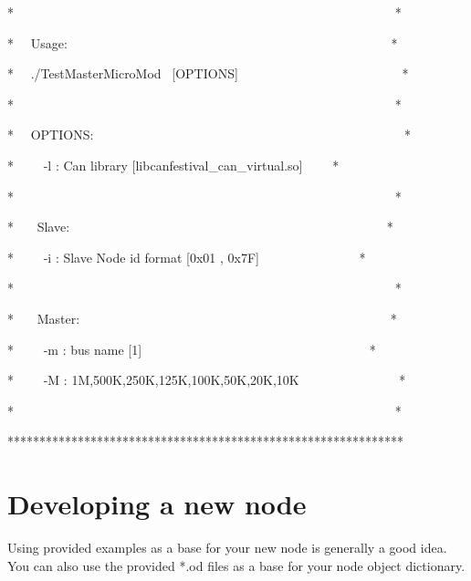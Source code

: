 \documentclass[12pt,twoside]{article}
\begin{document}
{\ttfamily
*
\ \ \ \ \ \ \ \ \ \ \ \ \ \ \ \ \ \ \ \ \ \ \ \ \ \ \ \ \ \ \ \ \ \ \ \ \ \ \ \ \ \ \ \ \ \ \ \ \ \ \ \ \ \ \ \ \ \ \ *}

{\ttfamily
* \ \ Usage:
\ \ \ \ \ \ \ \ \ \ \ \ \ \ \ \ \ \ \ \ \ \ \ \ \ \ \ \ \ \ \ \ \ \ \ \ \ \ \ \ \ \ \ \ \ \ \ \ \ \ *}

{\ttfamily
* \ \ ./TestMasterMicroMod \ [OPTIONS]
\ \ \ \ \ \ \ \ \ \ \ \ \ \ \ \ \ \ \ \ \ \ \ \ \ *}

{\ttfamily
*
\ \ \ \ \ \ \ \ \ \ \ \ \ \ \ \ \ \ \ \ \ \ \ \ \ \ \ \ \ \ \ \ \ \ \ \ \ \ \ \ \ \ \ \ \ \ \ \ \ \ \ \ \ \ \ \ \ \ \ *}

{\ttfamily
* \ \ OPTIONS:
\ \ \ \ \ \ \ \ \ \ \ \ \ \ \ \ \ \ \ \ \ \ \ \ \ \ \ \ \ \ \ \ \ \ \ \ \ \ \ \ \ \ \ \ \ \ \ \ *}

{\ttfamily
* \ \ \ \ {}-l : Can library
[{\textquotedbl}libcanfestival\_can\_virtual.so{\textquotedbl}]
\ \ \ \ *}

{\ttfamily
*
\ \ \ \ \ \ \ \ \ \ \ \ \ \ \ \ \ \ \ \ \ \ \ \ \ \ \ \ \ \ \ \ \ \ \ \ \ \ \ \ \ \ \ \ \ \ \ \ \ \ \ \ \ \ \ \ \ \ \ *}

{\ttfamily
* \ \ \ Slave:
\ \ \ \ \ \ \ \ \ \ \ \ \ \ \ \ \ \ \ \ \ \ \ \ \ \ \ \ \ \ \ \ \ \ \ \ \ \ \ \ \ \ \ \ \ \ \ \ \ *}

{\ttfamily
* \ \ \ \ {}-i : Slave Node id format [0x01 , 0x7F]
\ \ \ \ \ \ \ \ \ \ \ \ \ \ \ *}

{\ttfamily
*
\ \ \ \ \ \ \ \ \ \ \ \ \ \ \ \ \ \ \ \ \ \ \ \ \ \ \ \ \ \ \ \ \ \ \ \ \ \ \ \ \ \ \ \ \ \ \ \ \ \ \ \ \ \ \ \ \ \ \ *}

{\ttfamily
* \ \ \ Master:
\ \ \ \ \ \ \ \ \ \ \ \ \ \ \ \ \ \ \ \ \ \ \ \ \ \ \ \ \ \ \ \ \ \ \ \ \ \ \ \ \ \ \ \ \ \ \ \ *}

{\ttfamily
* \ \ \ \ {}-m : bus name [{\textquotedbl}1{\textquotedbl}]
\ \ \ \ \ \ \ \ \ \ \ \ \ \ \ \ \ \ \ \ \ \ \ \ \ \ \ \ \ \ \ \ \ \ \ *}

{\ttfamily
* \ \ \ \ {}-M : 1M,500K,250K,125K,100K,50K,20K,10K
\ \ \ \ \ \ \ \ \ \ \ \ \ \ \ *}

{\ttfamily
*
\ \ \ \ \ \ \ \ \ \ \ \ \ \ \ \ \ \ \ \ \ \ \ \ \ \ \ \ \ \ \ \ \ \ \ \ \ \ \ \ \ \ \ \ \ \ \ \ \ \ \ \ \ \ \ \ \ \ \ *}

{\ttfamily
**************************************************************}

\section{Developing a new node}
Using provided examples as a base for your new node is generally a good
idea. You can also use the provided *.od files as a base for your node
object dictionary.
\end{document}
